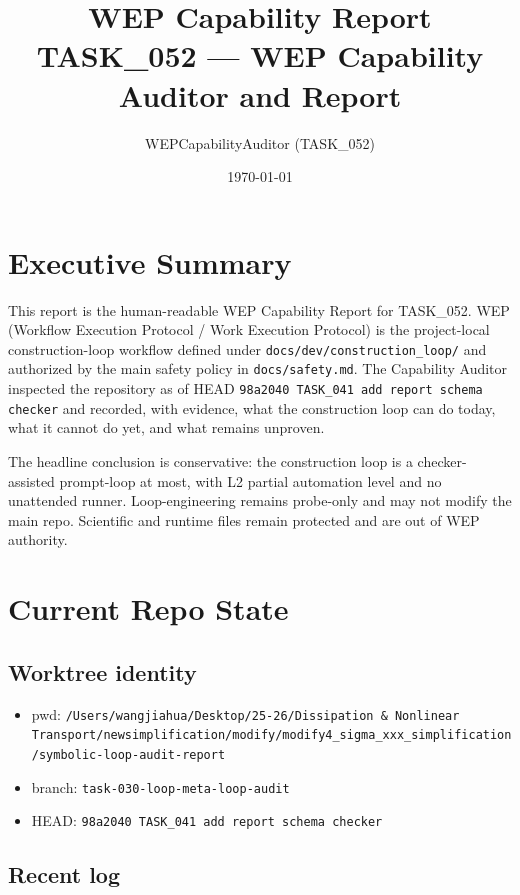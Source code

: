 \documentclass[11pt,a4paper]{article}
\title{\textbf{WEP Capability Report} \\
       \large TASK\_052 --- WEP Capability Auditor and Report}
\author{WEPCapabilityAuditor (TASK\_052)}
\date{\today}
\begin{document}
\maketitle

\section{Executive Summary}

This report is the human-readable WEP Capability Report for TASK\_052.
WEP (Workflow Execution Protocol / Work Execution Protocol) is the
project-local construction-loop workflow defined under
\texttt{docs/dev/construction\_loop/} and authorized by the main safety
policy in \texttt{docs/safety.md}. The Capability Auditor inspected the
repository as of HEAD \texttt{98a2040 TASK\_041 add report schema
checker} and recorded, with evidence, what the construction loop can do
today, what it cannot do yet, and what remains unproven.

The headline conclusion is conservative: the construction loop is a
checker-assisted prompt-loop at most, with L2 partial automation level
and no unattended runner. Loop-engineering remains probe-only and may
not modify the main repo. Scientific and runtime files remain protected
and are out of WEP authority.

\section{Current Repo State}

\subsection{Worktree identity}

\begin{itemize}[leftmargin=2em]
  \item pwd: \texttt{/Users/wangjiahua/Desktop/25-26/Dissipation \&
        Nonlinear Transport/newsimplification/modify/modify4\_sigma\_xxx\_simplification/symbolic-loop-audit-report}
  \item branch: \texttt{task-030-loop-meta-loop-audit}
  \item HEAD: \texttt{98a2040 TASK\_041 add report schema checker}
\end{itemize}

\subsection{Recent log}
\end{document}
